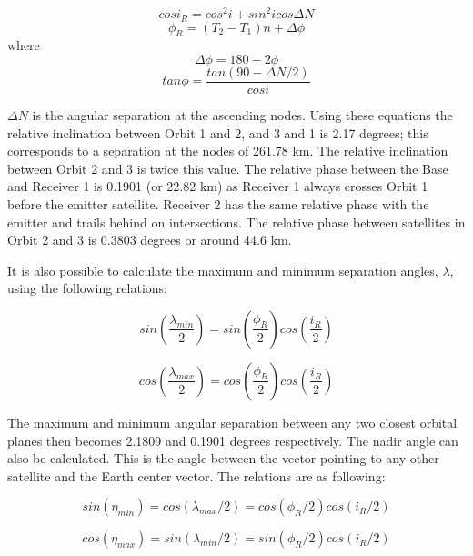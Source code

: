 \begin{equation}
cos i_R = cos^2i+sin^2i cos \Delta N
\label{ir}
\end{equation}
\begin{equation}
\phi_R = (T_2-T_1)n+ \Delta \phi
\label{phir}
\end{equation}
where
\begin{equation}
\Delta \phi = 180 - 2 \phi
\label{deltaPhi}
\end{equation}
\begin{equation}
tan \phi = \frac{tan ( 90 - \Delta N / 2)}{cos i}
\label{tanphi}
\end{equation}

$\Delta N$ is the angular separation at the ascending nodes. Using these equations the relative inclination between Orbit 1 and 2, and 3 and 1 is 2.17 degrees; this corresponds to a separation at the nodes of 261.78 km. The relative inclination between Orbit 2 and 3 is twice this value. The relative phase between the Base and Receiver 1 is 0.1901 (or 22.82 km) as Receiver 1 always crosses Orbit 1 before the emitter satellite. Receiver 2 has the same relative phase with the emitter and trails behind on intersections. The relative phase between satellites in Orbit 2 and 3 is 0.3803 degrees or around 44.6 km.

It is also possible to calculate the maximum and minimum separation angles, $\lambda$, using the following relations:

\begin{equation}
sin ( \frac{\lambda_{min}}{2} ) = sin ( \frac{ \phi_R }{2} ) cos ( \frac{i_R}{2} )
\label{lambdamin}
\end{equation}

\begin{equation}
cos ( \frac{\lambda_{max}}{2} ) = cos ( \frac{ \phi_R }{2} ) cos ( \frac{i_R}{2} )
\label{lambdamax}
\end{equation}

The maximum and minimum angular separation between any two closest orbital planes then becomes 2.1809 and 0.1901 degrees respectively. The nadir angle can also be calculated. This is the angle between the vector pointing to any other satellite and the Earth center vector. The relations are as following:

\begin{equation}
sin (\eta_{min} ) = cos(\lambda _{max}/2) = cos(\phi _R/2)cos(i_R/2)
\end{equation}

\begin{equation}
cos(\eta_{max} ) = sin(\lambda _{min}/2) = sin(\phi _R/2)cos(i_R/2)
\end{equation}

